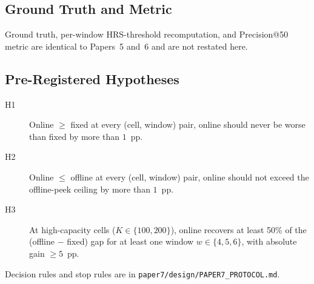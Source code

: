 \subsection{Ground Truth and Metric}

Ground truth, per-window HRS-threshold recomputation, and Precision@50
metric are identical to Papers~5 and~6 and are not restated here.

\subsection{Pre-Registered Hypotheses}

\begin{description}
\item[H1] Online $\geq$ fixed at every (cell, window) pair, online
should never be worse than fixed by more than $1$~pp.
\item[H2] Online $\leq$ offline at every (cell, window) pair, online
should not exceed the offline-peek ceiling by more than $1$~pp.
\item[H3] At high-capacity cells ($K \in \{100, 200\}$), online
recovers at least 50\% of the (offline $-$ fixed) gap for at least one
window $w \in \{4, 5, 6\}$, with absolute gain $\geq 5$~pp.
\end{description}

Decision rules and stop rules are in \texttt{paper7/design/PAPER7\_PROTOCOL.md}.
